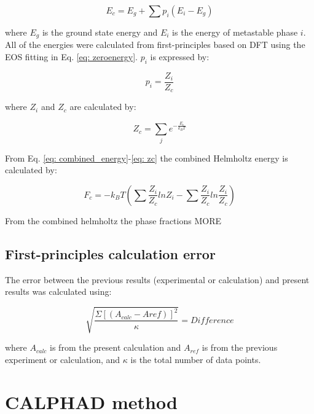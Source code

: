 \begin{equation}
\label{eq: combined_energy}
E_{c} = E_{g} + \sum p_{i} \left( E_{i} - E_{g} \right) 
\end{equation}

\noindent where $E_{g}$ is the ground state energy and $E_{i}$ is the energy of metastable phase $i$. All of the energies were calculated from first-principles based on DFT using the EOS fitting in Eq. \ref{eq: zeroenergy}. $p_{i}$ is expressed by:

\begin{equation}
\label{eq: pi}
p_{i} = \frac{Z_{i}}{Z_{c}} 
\end{equation}

\noindent where $Z_{i}$ and $Z_{c}$ are calculated by:

\begin{equation}
\label{eq: zc}
Z_{c} = \sum_{j} e^{- \frac{E_{c}}{k_{B}T}} 
\end{equation}

\noindent From Eq. \ref{eq: combined_energy}-\ref{eq: zc} the combined Helmholtz energy is calculated by:

\begin{equation}
\label{eq: combinedhelmholtz}
F_{c} = - k_{B} T \left( \sum \frac{Z_{i}}{Z_{c}} lnZ_{i} - \sum \frac{Z_{i}}{Z_{c}} ln \frac{Z_{i}}{Z_{c}}  \right)
\end{equation}

\noindent From the combined helmholtz the phase fractions MORE

\subsection{First-principles calculation error}

The error between the previous results (experimental or calculation) and present results was calculated using:

\begin{equation}
\label{eq: error}
\sqrt{\frac{\Sigma[(A_{calc}-A{ref})]^{2}}{\kappa}} = Difference
\end{equation}

\noindent where $A_{calc}$ is from the present calculation and $A_{ref}$ is from the previous experiment or calculation, and $\kappa$ is the total number of data points. 

\section{CALPHAD method}

